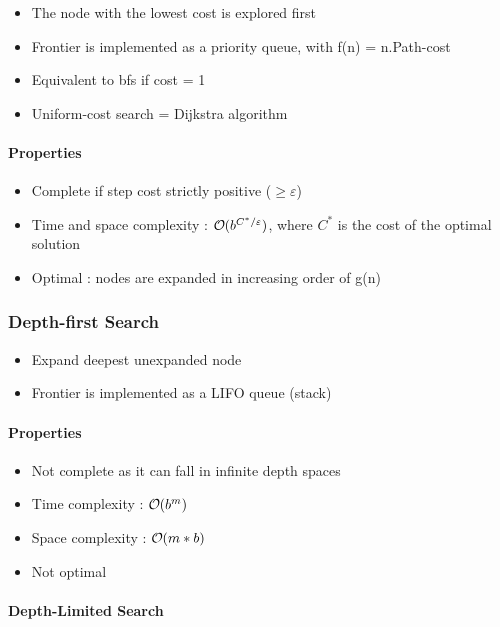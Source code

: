 \begin{itemize}
\item The node with the lowest cost is explored first
\item Frontier is implemented as a priority queue, with f(n) = n.Path-cost
\item Equivalent to bfs if cost = 1
\item Uniform-cost search = Dijkstra algorithm
\end{itemize}

\paragraph{Properties}
\begin{itemize}
\item Complete if step cost strictly positive ($\geq \varepsilon$)
\item Time and space complexity : $\bigO (b^{C^* / \varepsilon})$, where $C^*$ is the cost of the optimal solution
\item Optimal : nodes are expanded in increasing order of g(n)
\end{itemize}

\subsubsection{Depth-first Search}

\begin{itemize}
\item Expand deepest unexpanded node
\item Frontier is implemented as a LIFO queue (stack)
\end{itemize}

\paragraph{Properties}
\begin{itemize}
\item Not complete as it can fall in infinite depth spaces
\item Time complexity : $\bigO (b^m)$
\item Space complexity : $\bigO (m*b)$
\item Not optimal
\end{itemize}

\paragraph{Depth-Limited Search}

